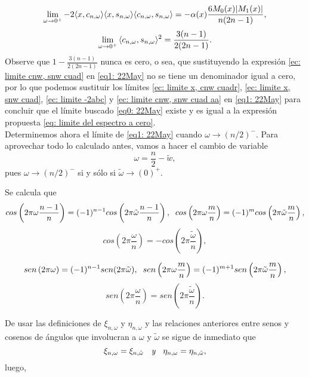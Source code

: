 \begin{equation}
\label{ec: limite -2abc}
\lim\limits_{\omega \rightarrow 0^{+}}{
-2 \langle x, c_{n, \omega} \rangle
\langle x, s_{n, \omega} \rangle
\langle c_{n, \omega}, s_{n, \omega} \rangle
= 
- \alpha(x) \frac{6M_{0}(x)|M_{1}(x)|}{n(2n-1)},
}
\end{equation}
\begin{equation}
\label{ec: limite cnw, snw cuad aa}
\lim\limits_{\omega \rightarrow 0^{+}}{\langle
c_{n, \omega}, s_{n, \omega}
\rangle^{2} }
= \frac{3(n-1)}{2(2n-1)}.
\end{equation}
Observe que $1-\frac{3(n-1)}{2(2n-1)}$
nunca es cero, o sea, que sustituyendo la 
expresión \eqref{ec: limite cnw, snw cuad}
en 
\eqref{eq1: 22May}
no se tiene un denominador igual a cero, por lo que podemos
sustituir los límites
\eqref{ec: limite x, cnw cuadr},
\eqref{ec: limite x, snw cuad},
\eqref{ec: limite -2abc} y
\eqref{ec: limite cnw, snw cuad aa}
en \eqref{eq1: 22May}
para concluir que el límite buscado
\eqref{eq0: 22May} existe y es igual
a la expresión propuesta 
\eqref{eq: limite del espectro a cero}. \\


Determinemos ahora el límite de
\eqref{eq1: 22May} cuando $\omega \rightarrow (n/2)^{-}$.
Para aprovechar todo lo calculado antes, vamos a hacer
el cambio de variable 
\[
\omega = \frac{n}{2} - \tilde{w},
\]
pues $\omega \rightarrow (n/2)^{-}$ si y sólo si
$\tilde{\omega} \rightarrow (0)^{+}$.


Se calcula que 
\[
cos\left(
2 \pi \omega\frac{n-1}{n}
\right) = (-1)^{n-1} cos\left(
2 \pi \tilde{\omega}\frac{n-1}{n}
\right), \hspace{0.2cm}
cos\left(
2 \pi \omega\frac{m}{n}
\right) = (-1)^{m} cos\left(
2 \pi \tilde{\omega}\frac{m}{n}
\right), 
\]
\[
cos\left(
2 \pi \frac{\omega}{n}
\right) = -cos\left(
2 \pi \frac{\tilde{\omega}}{n}
\right), 
\]


\[
sen \left( 2 \pi \omega \right)
= (-1)^{n-1} sen (2 \pi \tilde{\omega})
, \hspace{0.2cm}
sen\left(
2 \pi \omega\frac{m}{n}
\right) = (-1)^{m+1} sen\left(
2 \pi \tilde{\omega}\frac{m}{n}
\right), 
\]
\[
sen\left(
2 \pi \frac{\omega}{n}
\right) = sen\left(
2 \pi \frac{\tilde{\omega}}{n}
\right).
\]

De usar las definiciones
de $\xi_{n, \omega}$ y $\eta_{n, \omega}$
y las relaciones anteriores entre senos y cosenos
de ángulos que involucran a $\omega$ y $\tilde{\omega}$
se sigue de inmediato que
\[
\xi_{n, \omega} = \xi_{n, \tilde{\omega}}
\hspace{0.2cm} \textit{ y } \hspace{0.2cm}
\eta_{n, \omega} = \eta_{n, \tilde{\omega}},
\]
luego, 

